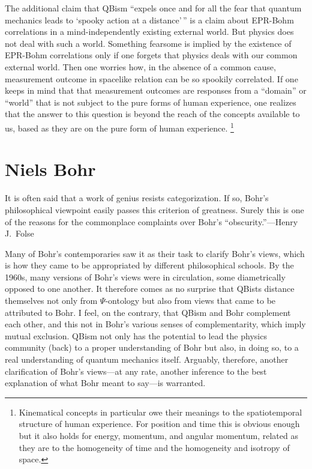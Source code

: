 \documentclass[smallextended]{svjour3}
\begin{document}
The additional claim that QBism ``expels once and for all the fear that quantum mechanics leads to `spooky action at a distance'\,''\cite{Fuchs_Perimeter} is a claim about EPR-Bohm correlations in a mind-independently existing external world. But physics does not deal with such a world. Something fearsome is implied by the existence of EPR-Bohm correlations only if one forgets that physics deals with our common external world. Then one worries how, in the absence of a common cause, measurement outcome in spacelike relation can be so spookily correlated. If one keeps in mind that that measurement outcomes are responses from a ``domain'' or ``world'' that is not subject to the pure forms of human experience, one realizes that the answer to this question is beyond the reach of the concepts available to us, based as they are on the pure form of human experience.%
\footnote{Kinematical concepts in particular owe their meanings to the spatiotemporal structure of human experience. For position and time this is obvious enough but it also holds for energy, momentum, and angular momentum, related as they are to the homogeneity of time and the homogeneity and isotropy of space.}


\section{Niels Bohr}\label{sec.Bohr}
{\leftskip\parindent\small It is often said that a work of genius resists categorization. If so, Bohr's philosophical viewpoint easily passes this criterion of greatness. Surely this is one of the reasons for the commonplace complaints over Bohr's ``obscurity.''---Henry J.\ Folse\cite{Folse}\par}\medskip

\noindent Many of Bohr's contemporaries saw it as their task to clarify Bohr's views, which is how they came to be appropriated by different philosophical schools. By the 1960s, many versions of Bohr's views were in circulation, some diametrically opposed to one another. It therefore comes as no surprise that QBists distance themselves not only from $\Psi$-ontology but also from views that came to be attributed to Bohr. I feel, on the contrary, that QBism and Bohr complement each other, and this not in Bohr's various senses of complementarity, which imply mutual exclusion. QBism not only has the potential to lead the physics community (back) to a proper understanding of Bohr but also, in doing so, to a real understanding of quantum mechanics itself. Arguably, therefore, another clarification of Bohr's views---at any rate, another inference to the best explanation of what Bohr meant to say---is warranted.
\end{document}
